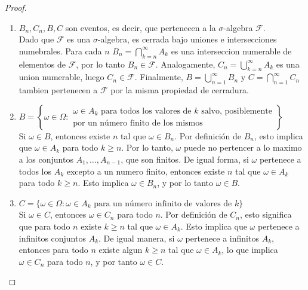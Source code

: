 \documentclass[12pt,a4paper]{article}
\begin{document}
    \begin{proof}
        \begin{enumerate}
            \item[(a)] $B_{n},C_{n},B,C$ son eventos, es decir, que pertenecen a la
            $\sigma$-algebra $\mathcal{F}$.\\
            Dado que $\mathcal{F}$ es una $\sigma$-algebra, es cerrada bajo uniones e intersecciones
            numebrales. Para cada $n$ $B_{n}=\bigcap_{k=n}^{\infty}A_{k}$ es una interseccion numerable de
            elementos de $\mathcal{F}$, por lo tanto $B_{n}\in\mathcal{F}$. Analogamente, $C_{n}=\bigcup_{k=n}^{\infty}A_{k}$
            es una union numerable, luego $C_{n}\in\mathcal{F}$. Finalmente, $B=\bigcup_{n=1}^{\infty}B_{n}$ y
            $C=\bigcap_{n=1}^{\infty}C_{n}$ tambien pertenecen a $\mathcal{F}$ por la misma propiedad de cerradura.
            \item[(b)] $B=\left\{\omega\in\Omega:\begin{matrix}
            \omega\in A_{k}\text{ para todos los valores de $k$ salvo, posiblemente}\\
            \text{por un número finito de los mismos}
            \end{matrix}\right\}$\\
            Si $\omega\in B$, entonces existe $n$ tal que $\omega\in B_{n}$. Por definición de $B_{n}$,
            esto implica que $\omega\in A_{k}$ para todo $k\geq n$. Por lo tanto, $\omega$ puede no pertencer
            a lo maximo a los conjuntos $A_{1},\dots,A_{n-1}$, que son finitos. De igual forma, si $\omega$
            pertenece a todos los $A_{k}$ excepto a un numero finito, entonces existe $n$ tal que $\omega\in A_{k}$
            para todo $k\geq n$. Esto implica $\omega\in B_{n}$, y por lo tanto $\omega\in B$.
            \item[(c)] $C=\{\omega\in\Omega:\omega\in A_{k}\text{ para un número infinito de valores de $k$}\}$\\
            Si $\omega\in C$, entonces $\omega\in C_{n}$ para todo $n$. Por definición de $C_{n}$,
            esto significa que para todo $n$ existe $k\geq n$ tal que $\omega\in A_{k}$. Esto
            implica que $\omega$ pertenece a infinitos conjuntos $A_{k}$. De igual manera, si
            $\omega$ pertenece a infinitos $A_{k}$, entonces para todo $n$ existe algun $k\geq n$
            tal que $\omega\in A_{k}$, lo que implica $\omega\in C_{n}$ para todo $n$, y por tanto
            $\omega\in C$.
        \end{enumerate}
    \end{proof}
\end{document}
